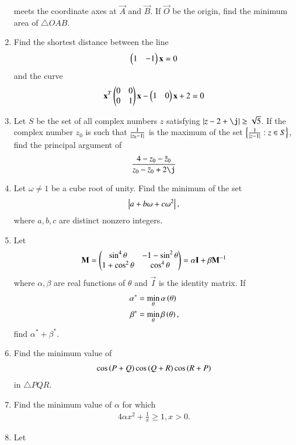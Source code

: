 \begin{enumerate}[label=\arabic*.,ref=\thesubsection.\theenumi]
\begin{equation}
\end{equation}
%
meets the coordinate axes at  $\vec{A}$  and  $\vec{B}$.  If   $\vec{O}$  be the origin, find the minimum area 
of $\triangle OAB$.
\item Find the shortest distance between the line 
\begin{equation}
\begin{pmatrix}1 & -1 \end{pmatrix}\mathbf{x}  =0
\end{equation}
%
and the curve
\begin{equation}
\mathbf{x}^T\begin{pmatrix}0 & 0 \\ 0 & 1\end{pmatrix}\mathbf{x} - \begin{pmatrix}1 & 0\end{pmatrix}\mathbf{x} + 2 =0
\end{equation}
\item Let $S$ be the set of all complex numbers $z$ satisfying $\abs{z-2+\j} \ge \sqrt{5}$. If the complex number $z_0$ is such that $\frac{1}{\left\vert z_0-1\right\vert}$ is the maximum of the set $\left\{\frac{1}{\left\vert z-1\right\vert}: z \in S\right\}$, find the principal argument of 
\begin{align}
\frac{4-z_0-\bar{z}_0}{z_0-\bar{z}_0+2\j}
\end{align}
\item Let $\omega \ne 1$ be a cube root of unity. Find the minimum of the set
\begin{align}
\left\vert a+b\omega+c\omega^2\right\vert, 
\end{align}
%
where $a,b,c$ are distinct nonzero integers.
\item Let 
\begin{align}
\label{eq:mat_def}
\mathbf{M} = \begin{pmatrix}\sin^4\theta & -1-\sin^2\theta \\ 1+ \cos^2\theta & \cos^4\theta\end{pmatrix} = \alpha\mathbf{I} + \beta \mathbf{M}^{-1}
\end{align}
where $\alpha, \beta$ are real functions of $\theta$ and $\vec{I}$ is the identity matrix. If 
\begin{align}
\alpha^{*} &= \min_{\theta}\alpha\left(\theta\right)
\\
\beta^{*} &= \min_{\theta}\beta\left(\theta\right), 
\end{align}
find $\alpha^{*} + \beta^{*}$.
\item Find the minimum value of 
\begin{align}
\cos \left(P+Q\right)
\cos \left(Q+R\right)
\cos \left(R+P\right)
\end{align}
%
in $\triangle PQR$.
\item Find the minimum value of $\alpha$ for which 
\begin{align}
4\alpha x^2 + \frac{1}{x} \ge 1, x > 0.
\end{align}
\item Let 

\end{enumerate}
